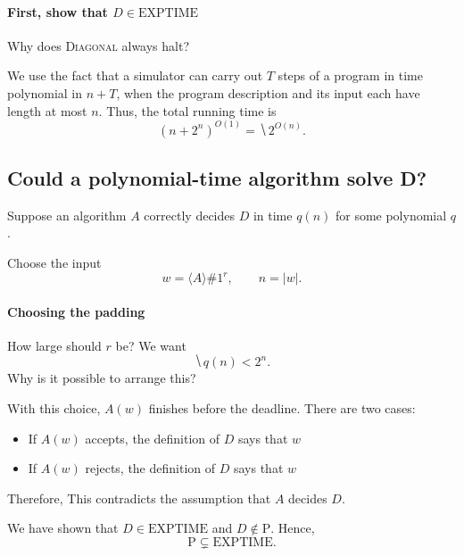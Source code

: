 \documentclass[11  pt]{article}
\begin{document}
\paragraph{First, show that $D\in\mathrm{EXPTIME}$}
Why does \textsc{Diagonal} always halt?
\vs{1cm}

We use the fact that a simulator can carry out $T$ steps of a program in time polynomial in $n+T$, when the program description and its input each have length at most $n$. Thus, the total running time is
\begin{equation*}
    (n+2^n)^{O(1)}=\hide{2^{O(n)}}.
\end{equation*}

\newpage
\subsection*{Could a polynomial-time algorithm solve D?}
Suppose an algorithm $A$ correctly decides $D$ in time $q(n)$ for some polynomial $q$.

Choose the input
\begin{equation*}
    w=\langle A\rangle\#1^r, \qquad n=|w|.
\end{equation*}

\paragraph{Choosing the padding}
How large should $r$ be? We want
\begin{equation*}
    \hide{q(n)<2^n.}
\end{equation*}
Why is it possible to arrange this?
\vs{1cm}

With this choice, $A(w)$ finishes before the deadline. There are two cases:
\begin{itemize}
    \item If $A(w)$ accepts, the definition of $D$ says that $w$ 
    \vs{.5cm}
    \item If $A(w)$ rejects, the definition of $D$ says that $w$ 
\end{itemize}

Therefore,  This contradicts the assumption that $A$ decides $D$.

\vfill
We have shown that $D\in\mathrm{EXPTIME}$ and $D\notin\mathrm{P}$. Hence,
\begin{equation*}
    \mathrm{P}\subsetneq\mathrm{EXPTIME}.
\end{equation*}
\end{document}
